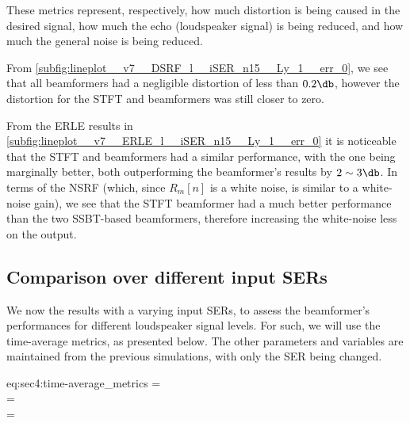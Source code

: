 These metrics represent, respectively, how much distortion is being caused in the desired signal, how much the echo (loudspeaker signal) is being reduced, and how much the general noise is being reduced.

From \cref{subfig:lineplot__v7__DSRF_l__iSER_n15__Ly_1__err_0}, we see that all beamformers had a negligible distortion of less than $0.2\dB$, however the distortion for the STFT and \tssbt{} beamformers was still closer to zero.

From the ERLE results in \cref{subfig:lineplot__v7__ERLE_l__iSER_n15__Ly_1__err_0} it is noticeable that the STFT and \nssbt{} beamformers had a similar performance, with the \tssbt{} one being marginally better, both outperforming the \nssbt{} beamformer's results by $2\sim3\dB$. In terms of the NSRF (which, since $R_m[n]$ is a white noise, is similar to a white-noise gain), we see that the STFT beamformer had a much better performance than the two SSBT-based beamformers, therefore increasing the white-noise less on the output.

\subsection{Comparison over different input SERs}

We now the results with a varying input SERs, to assess the beamformer's performances for different loudspeaker signal levels. For such, we will use the time-average metrics, as presented below. The other parameters and variables are maintained from the previous simulations, with only the SER being changed.

\begin{subgather}{eq:sec4:time-average_metrics}
	\dsrf =  \\
	\erle =  \\
	\nsrf = 
\end{subgather}


